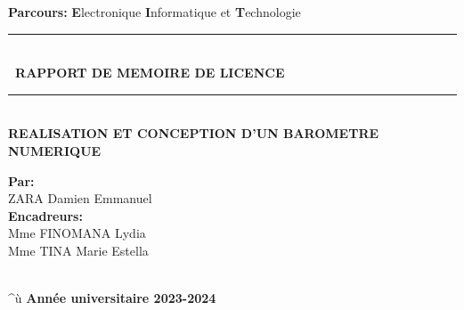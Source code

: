 \documentclass[a4paper,12pt]{report}
\begin{document}
\begin{titlepage}
\begin{center}
\textsc{\Large}
{\large \bfseries Parcours: }
{\large \textbf{E}lectronique \textbf{I}nformatique et \textbf{T}echnologie }\\[1cm]




\rule{\linewidth}{0.2mm} \\[0.4cm]
{ \bfseries\ RAPPORT DE MEMOIRE DE LICENCE \\[0.1cm] }
\rule{\linewidth}{0.2mm} \\[3cm]



\textsc{\huge}
{\huge \bfseries\color{blue} REALISATION ET CONCEPTION D'UN BAROMETRE NUMERIQUE  \\[4cm] }



\begin{minipage}{0.5\textwidth}
  \begin{flushleft} \large
    \large \textbf{Par:}\\
    \setlength{\indent}
    \textsc{ZARA} Damien Emmanuel \\[1cm]
    \large \textbf{Encadreurs:}\\
   \setlength{\indent}   Mme FINOMANA Lydia \\
   \setlength{\indent}   Mme TINA Marie Estella \\
    	
  \end{flushleft}
\end{minipage}%
\begin{minipage}{0.8\textwidth}
  
\end{minipage}\\[1.8cm]


^ù
{\textbf{\large {Année universitaire} 2023-2024}}

\end{center}
\end{titlepage}
\end{document}
